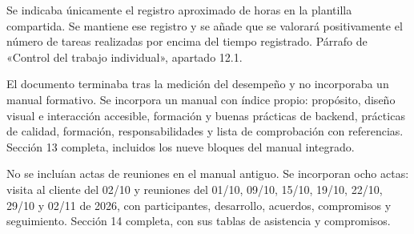 {Se indicaba únicamente el registro aproximado de horas en la plantilla compartida.}
{Se mantiene ese registro y se añade que se valorará positivamente el número de tareas realizadas por encima del tiempo registrado.}
{Párrafo de «Control del trabajo individual», apartado 12.1.}

{El documento terminaba tras la medición del desempeño y no incorporaba un manual formativo.}
{Se incorpora un manual con índice propio: propósito, diseño visual e interacción accesible, formación y buenas prácticas de backend, prácticas de calidad, formación, responsabilidades y lista de comprobación con referencias.}
{Sección 13 completa, incluidos los nueve bloques del manual integrado.}

{No se incluían actas de reuniones en el manual antiguo.}
{Se incorporan ocho actas: visita al cliente del 02/10 y reuniones del 01/10, 09/10, 15/10, 19/10, 22/10, 29/10 y 02/11 de 2026, con participantes, desarrollo, acuerdos, compromisos y seguimiento.}
{Sección 14 completa, con sus tablas de asistencia y compromisos.}
